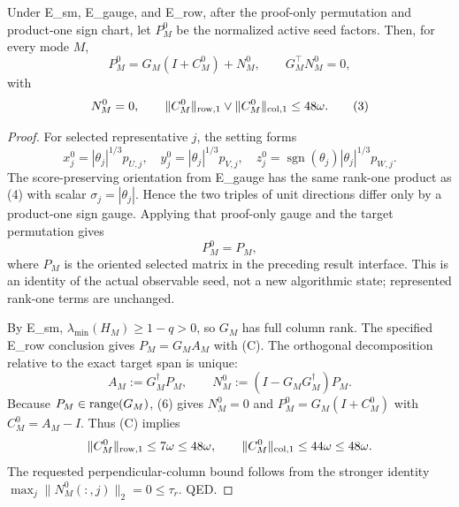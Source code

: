 \begin{lemma}\label{lem:step-008-seed-decomp}
Under E\_sm, E\_gauge, and E\_row, after the
proof-only permutation and product-one sign chart, let $P_M^0$ be the
normalized active seed factors. Then, for every mode $M$,
\[
 P_M^0=G_M(I+C_M^0)+N_M^0,\qquad G_M^\top N_M^0=0, \tag{2}
\]
with
\[
 N_M^0=0,\qquad
 \|C_M^0\|_{\rm row,1}\vee\|C_M^0\|_{\rm col,1}\le48\omega. \tag{3}
\]

\begin{proof}

For selected representative $j$, the setting forms
\[
 x_j^0=|\theta_j|^{1/3}p_{U,j},\quad
 y_j^0=|\theta_j|^{1/3}p_{V,j},\quad
 z_j^0=\operatorname{sgn}(\theta_j)|\theta_j|^{1/3}p_{W,j}. \tag{4}
\]
The score-preserving orientation from E\_gauge has the same rank-one product
as (4) with scalar $\sigma_j=|\theta_j|$. Hence the two triples of unit
directions differ only by a product-one sign gauge. Applying that proof-only
gauge and the target permutation gives
\[
 P_M^0=P_M, \tag{5}
\]
where $P_M$ is the oriented selected matrix in the preceding result
interface. This is an identity of the actual observable seed, not a new
algorithmic state; represented rank-one terms are unchanged.

By E\_sm, $\lambda_{\min}(H_M)\ge1-q>0$, so $G_M$ has full column rank. The
specified E\_row conclusion gives $P_M=G_MA_M$ with (C). The orthogonal
decomposition relative to the exact target span is unique:
\[
 A_M:=G_M^\dagger P_M,\qquad
 N_M^0:=(I-G_MG_M^\dagger)P_M. \tag{6}
\]
Because $P_M\in{\rm range}(G_M)$, (6) gives $N_M^0=0$ and
$P_M^0=G_M(I+C_M^0)$ with $C_M^0=A_M-I$. Thus (C) implies
\[
 \|C_M^0\|_{\rm row,1}\le7\omega\le48\omega,\qquad
 \|C_M^0\|_{\rm col,1}\le44\omega\le48\omega.
\]
The requested perpendicular-column bound follows from the stronger identity
$\max_j\|N_M^0(:,j)\|_2=0\le\tau_r$. QED.


\end{proof}
\end{lemma}
